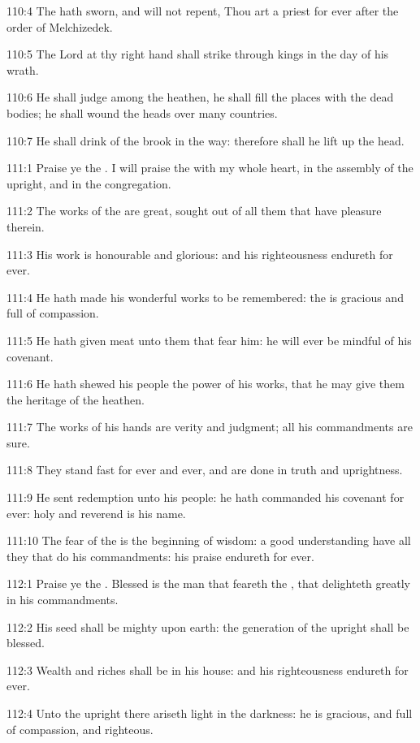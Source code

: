 110:4 The \LORD hath sworn, and will not repent, Thou art a priest for
ever after the order of Melchizedek.

110:5 The Lord at thy right hand shall strike through kings in the day
of his wrath.

110:6 He shall judge among the heathen, he shall fill the places with
the dead bodies; he shall wound the heads over many countries.

110:7 He shall drink of the brook in the way: therefore shall he lift
up the head.



111:1 Praise ye the \LORD. I will praise the \LORD with my whole heart,
in the assembly of the upright, and in the congregation.

111:2 The works of the \LORD are great, sought out of all them that
have pleasure therein.

111:3 His work is honourable and glorious: and his righteousness
endureth for ever.

111:4 He hath made his wonderful works to be remembered: the \LORD is
gracious and full of compassion.

111:5 He hath given meat unto them that fear him: he will ever be
mindful of his covenant.

111:6 He hath shewed his people the power of his works, that he may
give them the heritage of the heathen.

111:7 The works of his hands are verity and judgment; all his
commandments are sure.

111:8 They stand fast for ever and ever, and are done in truth and
uprightness.

111:9 He sent redemption unto his people: he hath commanded his
covenant for ever: holy and reverend is his name.

111:10 The fear of the \LORD is the beginning of wisdom: a good
understanding have all they that do his commandments: his praise
endureth for ever.



112:1 Praise ye the \LORD. Blessed is the man that feareth the \LORD,
that delighteth greatly in his commandments.

112:2 His seed shall be mighty upon earth: the generation of the
upright shall be blessed.

112:3 Wealth and riches shall be in his house: and his righteousness
endureth for ever.

112:4 Unto the upright there ariseth light in the darkness: he is
gracious, and full of compassion, and righteous.

